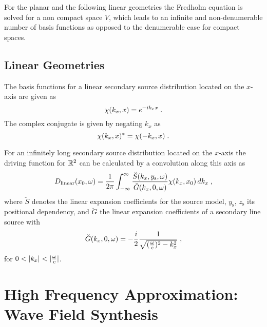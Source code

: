 For the planar and the following linear geometries the Fredholm equation is
solved for a non compact space $V$, which leads to an infinite and
non-denumerable number of basis functions as
opposed to the denumerable case for compact spaces.\autocite{Schultz2014}


\subsection{Linear Geometries}
\label{sec:linear_geometries}

The basis functions for a linear secondary source distribution
located on the $x$-axis are given as
%
\begin{equation}
    \chi(k_x,x) = e^{-ik_x x} \qp
    \label{eq:linear_harmonics}
\end{equation}
%
The complex conjugate is given by negating $k_x$ as
%
\begin{equation}
    \chi(k_x,x)^* = \chi(-k_x,x) \;.
\end{equation}
%

For an infinitely long secondary source distribution located on the $x$-axis the
driving function for $\mathbb{R}^2$ can be calculated by a convolution along this axis
as\autocite[Compare (3.73) in][]{Ahrens2012}
%
\begin{equation}
    D_\text{linear}(x_0,\omega) = \frac{1}{2\pi} \int_{-\infty}^\infty
    \frac{\breve{S}(k_x,y_\text{s},\omega)}{\breve{G}(k_x,0,\omega)}
    \chi(k_x,x_0) \, dk_x \qc
    \label{eq:D_linear}
\end{equation}
%
where $\breve{S}$ denotes the linear expansion coefficients for the
source model, $y_\text{s}$, $z_\text{s}$ its positional dependency,
and $\breve{G}$ the linear expansion coefficients of a secondary line source with
%
\begin{equation}
    \breve{G}(k_x,0,\omega) = -\frac{i}{2} \frac{1}{\sqrt{(\omegac)^2-k_x^2}}
    \qc
    \label{eq:G_linear}
\end{equation}
%
for $0<|k_x|<|\omegac|$.


\section[Wave Field Synthesis]{High Frequency Approximation: Wave Field Synthesis}
\label{sec:WFS}

